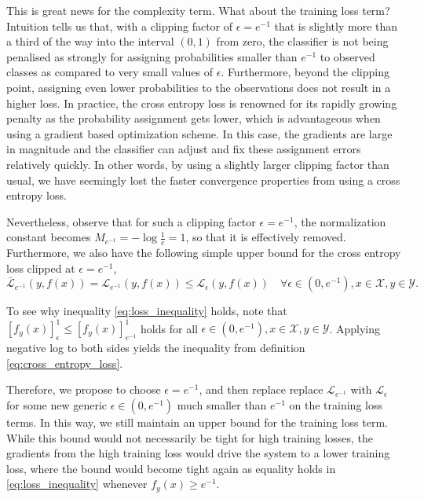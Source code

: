\documentclass[runningheads, envcountsame, a4paper]{llncs}
\begin{document}
			This is great news for the complexity term. What about the training loss term? Intuition tells us that, with a clipping factor of $\epsilon = e^{-1}$ that is slightly more than a third of the way into the interval $(0, 1)$ from zero, the classifier is not being penalised as strongly for assigning probabilities smaller than $e^{-1}$ to observed classes as compared to very small values of $\epsilon$. Furthermore, beyond the clipping point, assigning even lower probabilities to the observations does not result in a higher loss. In practice, the cross entropy loss is renowned for its rapidly growing penalty as the probability assignment gets lower, which is advantageous when using a gradient based optimization scheme. In this case, the gradients are large in magnitude and the classifier can adjust and fix these assignment errors relatively quickly. In other words, by using a slightly larger clipping factor than usual, we have seemingly lost the faster convergence properties from using a cross entropy loss.
			
			Nevertheless, observe that for such a clipping factor $\epsilon = e^{-1}$, the normalization constant becomes $M_{e^{-1}} = - \log{\frac{1}{e}} = 1$, so that it is effectively removed. Furthermore, we also have the following simple upper bound for the cross entropy loss clipped at $\epsilon = e^{-1}$,
			\begin{equation}
				\bar{\mathcal{L}}_{e^{-1}}(y, f(x)) = \mathcal{L}_{e^{-1}}(y, f(x)) \leq \mathcal{L}_{\epsilon}(y, f(x)) \quad \forall \epsilon \in (0, e^{-1}), x \in \mathcal{X}, y \in \mathcal{Y}.
			\label{eq:loss_inequality}
			\end{equation}
			
			To see why inequality \eqref{eq:loss_inequality} holds, note that $[f_{y}(x)]_{\epsilon}^{1} \leq [f_{y}(x)]_{e^{-1}}^{1}$ holds for all $\epsilon \in (0, e^{-1}), x \in \mathcal{X}, y \in \mathcal{Y}$. Applying negative log to both sides yields the inequality from definition \eqref{eq:cross_entropy_loss}.
			
			Therefore, we propose to choose $\epsilon = e^{-1}$, and then replace replace $\mathcal{L}_{e^{-1}}$ with $\mathcal{L}_{\epsilon}$ for some new generic $\epsilon \in (0, e^{-1})$ much smaller than $e^{-1}$ on the training loss terms. In this way, we still maintain an upper bound for the training loss term. While this bound would not necessarily be tight for high training losses, the gradients from the high training loss would drive the system to a lower training loss, where the bound would become tight again as equality holds in \eqref{eq:loss_inequality} whenever $f_{y}(x) \geq e^{-1}$.
			
\end{document}
